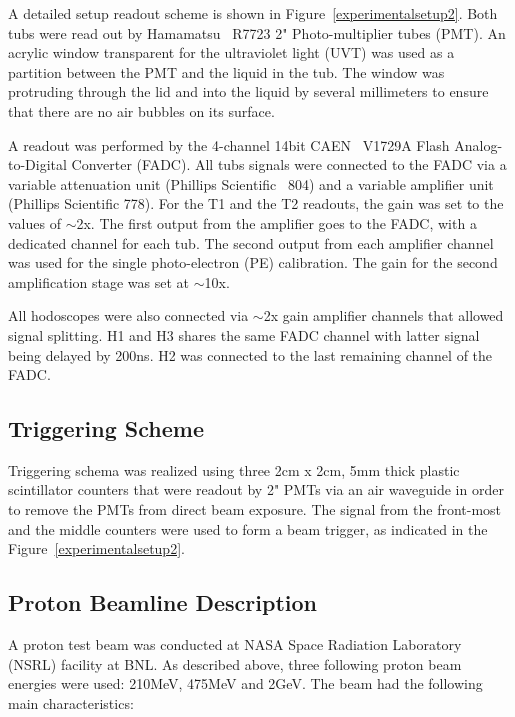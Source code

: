 \documentclass[preprint,12pt]{elsarticle}
\begin{document}
A detailed setup readout scheme is shown in Figure~\ref{experimentalsetup2}. Both tubs were read out by Hamamatsu~\cite{hamamatsu} R7723 2"  Photo-multiplier tubes (PMT). An acrylic window transparent for the ultraviolet light (UVT) was used as a partition between the PMT and the liquid in the tub. The window was protruding through the lid and into the liquid by several millimeters to ensure that there are no air bubbles on its surface.

A readout was performed by the 4-channel 14bit CAEN~\cite{caen} V1729A Flash Analog-to-Digital Converter (FADC). All tubs signals were connected to the FADC via a variable attenuation unit (Phillips Scientific~\cite{phillips} 804) and a variable amplifier unit (Phillips Scientific 778). For the T1 and the T2 readouts, the gain was set to the values of $\sim$2x. The first output from the amplifier goes to the FADC, with a dedicated channel for each tub. The second output from each amplifier channel was used for the single photo-electron (PE) calibration. The gain for the second amplification stage was set at $\sim$10x.

All hodoscopes were also connected via $\sim$2x gain amplifier channels that allowed signal splitting. H1 and H3 shares the same FADC channel with latter signal being delayed by 200ns. H2 was connected to the last remaining channel of the FADC.



\subsection{Triggering Scheme}
\label{trigs}
Triggering schema was realized using three 2cm x 2cm, 5mm thick plastic scintillator counters that were readout by 2" PMTs via an air waveguide in order to remove the PMTs from direct beam exposure. The signal from the front-most and the middle counters were used to form a beam trigger, as indicated in the Figure~\ref{experimentalsetup2}.




\subsection{Proton Beamline Description}
\label{pbeamsection}
A proton test beam was conducted at NASA Space Radiation Laboratory (NSRL) facility at BNL. As described above, three following proton beam energies were used:
210MeV, 475MeV and 2GeV. The beam had the following main characteristics:
\end{document}
